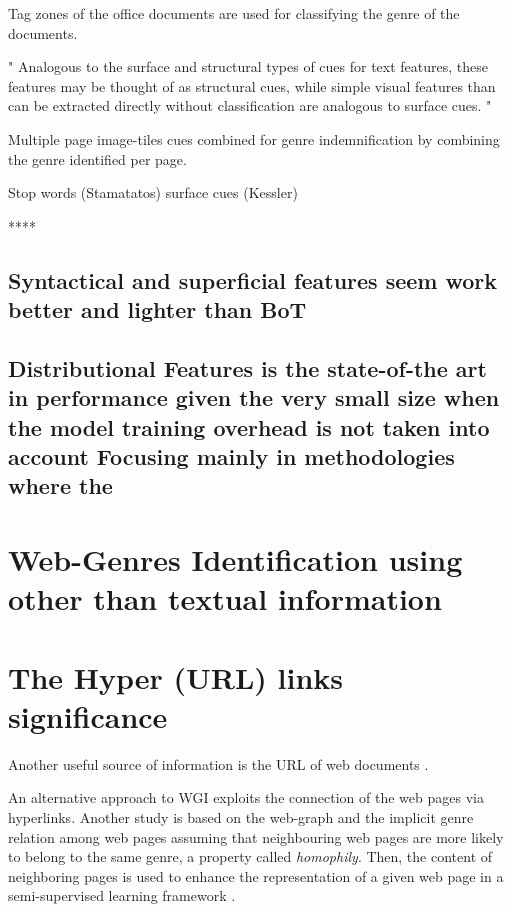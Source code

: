 Tag zones of the office documents are used for classifying the genre of the documents. 

" Analogous to the surface and structural types of cues for text features, these features may be thought of as structural cues, while simple visual features than can be extracted directly without classification are analogous to surface cues. "

Multiple page image-tiles cues combined for genre indemnification by combining the genre identified per page.

Stop words (Stamatatos) surface cues (Kessler)

****




\subsection{Syntactical and superficial features seem work better and lighter than BoT}

\subsection{Distributional Features is the state-of-the art in performance given the very small size when the model training overhead is not taken into account Focusing mainly in methodologies where the }



\section{Web-Genres Identification using other than textual information}\label{chap:relevant_work:sec:intro}


\section{The Hyper (URL) links significance}\label{chap:relevant_work:sec:intro}

 Another useful source of information is the URL of web documents  \parencite{abramson2012_URL,jebari2014pure_URL,priyatam2013don_URL}.

An alternative approach to WGI exploits the connection of the web pages via hyperlinks. 
Another study is based on the web-graph and the implicit genre relation among web pages assuming that neighbouring web pages are more likely to belong to the same genre, a property called \textit{homophily}. Then, the content of neighboring pages is used to enhance the representation of a given web page in a semi-supervised learning framework \parencite{asheghi2014semi}.

